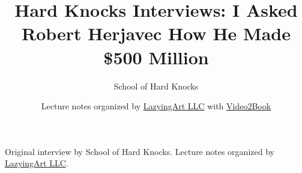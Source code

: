 \documentclass[11pt,oneside]{book}
\begin{document}
\frontmatter
\title{Hard Knocks Interviews: I Asked Robert Herjavec How He Made \$500 Million}
\author{School of Hard Knocks}
\date{Lecture notes organized by \href{https://lazying.art}{LazyingArt LLC} with \href{https://github.com/lachlanchen/Video2Book}{Video2Book}}
\maketitle
\begin{center}
\small Original interview by School of Hard Knocks. Lecture notes organized by \href{https://lazying.art}{LazyingArt LLC}.
\end{center}
\clearpage
\mainmatter

\end{document}
